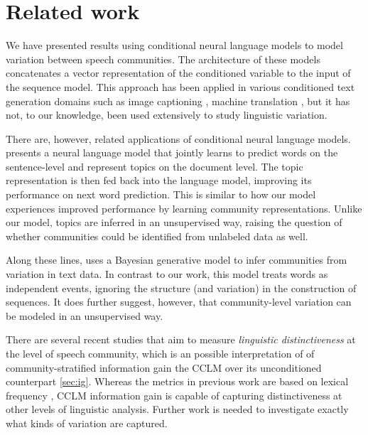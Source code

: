 \documentclass[11pt]{article}
\begin{document}
\section{Related work}\label{sec:related-work}

We have presented results using conditional neural language models
to model variation between speech communities.
The architecture of these models concatenates a vector representation
of the conditioned variable to the input of the sequence model.
This approach has been applied in various conditioned text generation domains such as 
image captioning \citep{Vinyals2015}, machine translation \citep{Kalchbrenner2013},
but it has not, to our knowledge, been used extensively to study linguistic variation.

There are, however, related applications of conditional neural language models.
\citet{Lau2017a} presents a neural language model that jointly learns to predict
words on the sentence-level and represent topics on the document level.
The topic representation is then fed back into the language model, 
improving its performance on next word prediction.
This is similar to how our model experiences improved performance
by learning community representations. 
Unlike our model, topics are inferred in an unsupervised way, 
raising the question of whether communities could be identified from 
unlabeled data as well.

Along these lines, \citet{OConnor2010} uses a Bayesian generative
model to infer communities from variation in text data.  In contrast
to our work, this model treats words as independent events, ignoring
the structure (and variation) in the construction of sequences.  It
does further suggest, however, that community-level variation can be
modeled in an unsupervised way.

There are several recent studies that aim to measure \emph{linguistic distinctiveness}
at the level of speech community, which is an possible interpretation of 
of community-stratified information gain the CCLM over its unconditioned counterpart \cref{sec:ig}. Whereas the metrics in previous work are based on lexical frequency
\citep{OConnor2010,Zhang2018,Lucy2021}, CCLM information gain is capable of capturing 
distinctiveness at other levels of linguistic analysis. Further work is needed to
investigate exactly what kinds of variation are captured.

\end{document}

